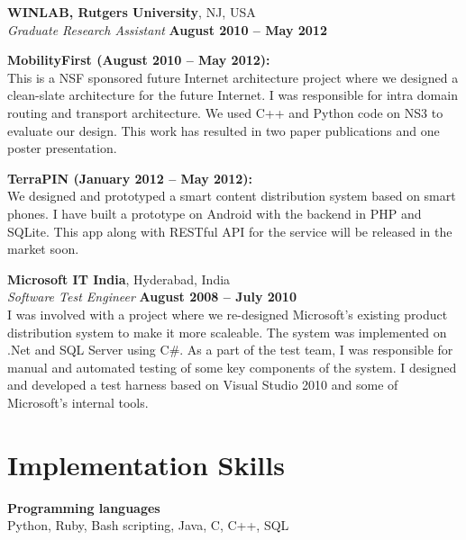 \documentclass[margin,line]{resume}
\begin{document}
\begin{resume}
    \textbf{WINLAB, Rutgers University}, NJ, USA \\
    \textsl{Graduate Research Assistant} \hfill \textbf{August 2010 -- May 2012}\\\vspace{-3mm}
    \begin{list2}
        \item \textbf{MobilityFirst (August 2010 -- May 2012):}\\
	This is a NSF sponsored future Internet architecture project where we designed a clean-slate architecture for the future Internet. I was responsible for intra domain routing and transport architecture. We used C++ and Python code on NS3 to evaluate our design. This work has resulted in two paper publications and one poster presentation.
        \item \textbf{TerraPIN (January 2012 -- May 2012):}\\
	We designed and prototyped a smart content distribution system based on smart phones. I have built a prototype on Android with the backend in PHP and SQLite. This app along with RESTful API for the service will be released in the market soon.
    \end{list2}

    \textbf{Microsoft IT India}, Hyderabad, India \\%
    \textsl{Software Test Engineer} \hfill \textbf{August 2008 -- July 2010}\\
    I was involved with a project where we re-designed Microsoft's existing product distribution system to make it more scaleable. The system was implemented on .Net and SQL Server using C\#. As a part of the test team, I was responsible for manual and automated testing of some key components of the system. I designed and developed a test harness based on Visual Studio 2010 and some of Microsoft's internal tools.

    \section{\mysidestyle Implementation Skills} 

    \textbf{Programming languages}\\
Python, Ruby, Bash scripting, Java, C, C++, SQL


\end{resume}
\end{document}
